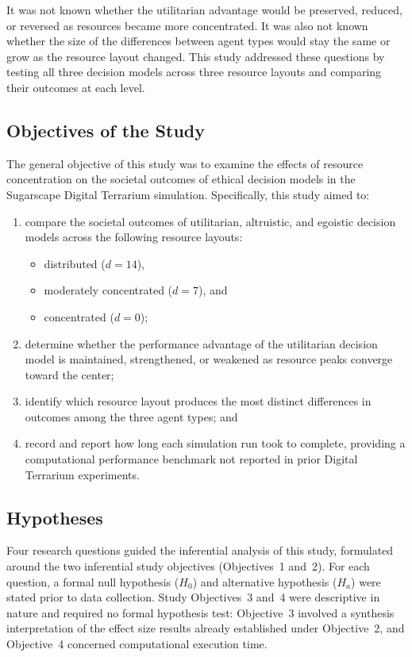 \documentclass{icsthesis}
\begin{document}
\begin{mainmatter}
				It was not known whether the utilitarian advantage would be preserved, reduced, or reversed as resources became more concentrated. It was also not known whether the size of the differences between agent types would stay the same or grow as the resource layout changed. This study addressed these questions by testing all three decision models across three resource layouts and comparing their outcomes at each level.

\newpage
			\subsection{Objectives of the Study}
				The general objective of this study was to examine the effects of resource concentration on the societal outcomes of ethical decision models in the Sugarscape Digital Terrarium simulation. Specifically, this study aimed to:

				\begin{enumerate}
					\item compare the societal outcomes of utilitarian, altruistic, and egoistic decision models across the following resource layouts:
						\begin{itemize}
							\item[a.] distributed ($d = 14$),
							\item[b.] moderately concentrated ($d = 7$), and
							\item[c.] concentrated ($d = 0$);
						\end{itemize}
					\item determine whether the performance advantage of the utilitarian decision model is maintained, strengthened, or weakened as resource peaks converge toward the center;
					\item identify which resource layout produces the most distinct differences in outcomes among the three agent types; and
					\item record and report how long each simulation run took to complete, providing a computational performance benchmark not reported in prior Digital Terrarium experiments.
				\end{enumerate}
\newpage
\subsection{Hypotheses}

Four research questions guided the inferential analysis of this study, formulated around the two inferential study objectives (Objectives~1 and~2). For each question, a formal null hypothesis ($H_0$) and alternative hypothesis ($H_a$) were stated prior to data collection. Study Objectives~3 and~4 were descriptive in nature and required no formal hypothesis test: Objective~3 involved a synthesis interpretation of the effect size results already established under Objective~2, and Objective~4 concerned computational execution time.


\end{mainmatter}
\end{document}
